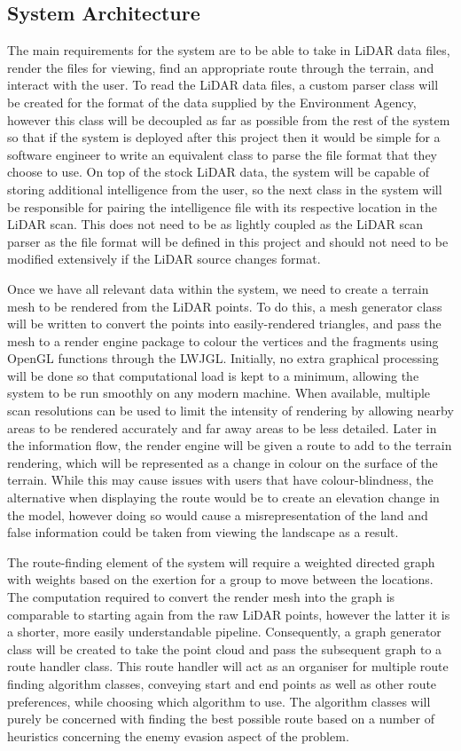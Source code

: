\documentclass[12pt,a4paper]{article}
\begin{document}
  \subsection{System Architecture}
  \noindent The main requirements for the system are to be able to take in LiDAR data files, render the files for viewing, find an appropriate route through the terrain, and interact with the user. To read the LiDAR data files, a custom parser class will be created for the format of the data supplied by the Environment Agency, however this class will be decoupled as far as possible from the rest of the system so that if the system is deployed after this project then it would be simple for a software engineer to write an equivalent class to parse the file format that they choose to use. On top of the stock LiDAR data, the system will be capable of storing additional intelligence from the user, so the next class in the system will be responsible for pairing the intelligence file with its respective location in the LiDAR scan. This does not need to be as lightly coupled as the LiDAR scan parser as the file format will be defined in this project and should not need to be modified extensively if the LiDAR source changes format.
  \par Once we have all relevant data within the system, we need to create a terrain mesh to be rendered from the LiDAR points. To do this, a mesh generator class will be written to convert the points into easily-rendered triangles, and pass the mesh to a render engine package to colour the vertices and the fragments using OpenGL functions through the LWJGL. Initially, no extra graphical processing will be done so that computational load is kept to a minimum, allowing the system to be run smoothly on any modern machine. When available, multiple scan resolutions can be used to limit the intensity of rendering by allowing nearby areas to be rendered accurately and far away areas to be less detailed. Later in the information flow, the render engine will be given a route to add to the terrain rendering, which will be represented as a change in colour on the surface of the terrain. While this may cause issues with users that have colour-blindness, the alternative when displaying the route would be to create an elevation change in the model, however doing so would cause a misrepresentation of the land and false information could be taken from viewing the landscape as a result.
  \par The route-finding element of the system will require a weighted directed graph with weights based on the exertion for a group to move between the locations. The computation required to convert the render mesh into the graph is comparable to starting again from the raw LiDAR points, however the latter it is a shorter, more easily understandable pipeline. Consequently, a graph generator class will be created to take the point cloud and pass the subsequent graph to a route handler class. This route handler will act as an organiser for multiple route finding algorithm classes, conveying start and end points as well as other route preferences, while choosing which algorithm to use. The algorithm classes will purely be concerned with finding the best possible route based on a number of heuristics concerning the enemy evasion aspect of the problem.
\end{document}
